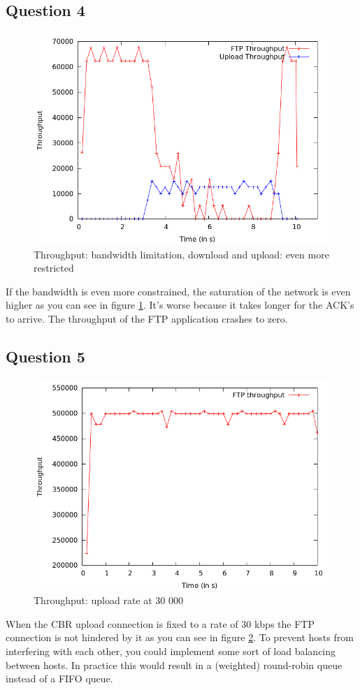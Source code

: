 \documentclass[11pt,a4paper]{article}
\begin{document}
\subsection{Question 4}
\begin{figure}[h!]
 \centering
 \includegraphics[width = 0.8\linewidth]{./output-ex1-part-4-1-7.png}
 \caption{Throughput: bandwidth limitation, download and upload: even more restricted}
 \label{fig:Q4}
\end{figure}
If the bandwidth is even more constrained, the saturation of the network is even higher as you can see in figure \ref{fig:Q4}. It's worse because it takes longer for the ACK's to arrive. The throughput of the FTP application crashes to zero.

\subsection{Question 5}
\begin{figure}[h!]
 \centering
 \includegraphics[width = 0.8\linewidth]{./output-ex1-part5.png}
 \caption{Throughput: upload rate at 30 000}
 \label{fig:Q5}
\end{figure}
When the CBR upload connection is fixed to a rate of 30 kbps the FTP connection is not hindered by it as you can see in figure \ref{fig:Q5}.
To prevent hosts from interfering with each other, you could implement some sort of load balancing between hosts. In practice this would result in a (weighted) round-robin queue instead of a FIFO queue.  
\end{document}
